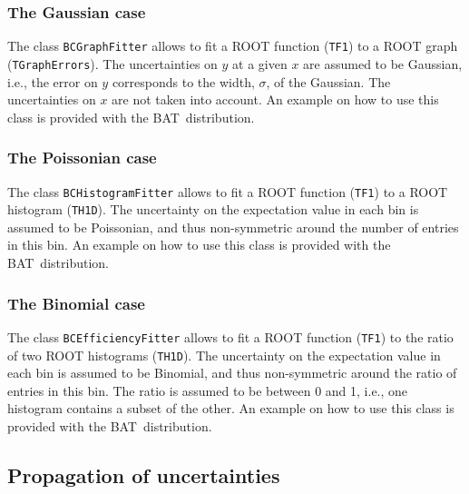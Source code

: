 \documentclass[11pt, a4paper]{article}
\newcommand{\BAT}{{\sc BAT}}
\begin{document}
\subsubsection{The Gaussian case}\label{BCGraphFitter} 

The class \verb|BCGraphFitter| allows to fit a ROOT function
(\verb|TF1|) to a ROOT graph (\verb|TGraphErrors|). The uncertainties
on $y$ at a given $x$ are assumed to be Gaussian, i.e., the error on
$y$ corresponds to the width, $\sigma$, of the Gaussian. The
uncertainties on $x$ are not taken into account. An example on how to
use this class is provided with the \BAT\ distribution.


\subsubsection{The Poissonian case} 

The class \verb|BCHistogramFitter| allows to fit a ROOT function
(\verb|TF1|) to a ROOT histogram (\verb|TH1D|). The uncertainty on the
expectation value in each bin is assumed to be Poissonian, and thus
non-symmetric around the number of entries in this bin. An example on
how to use this class is provided with the \BAT\ distribution.


\subsubsection{The Binomial case} 

The class \verb|BCEfficiencyFitter| allows to fit a ROOT function
(\verb|TF1|) to the ratio of two ROOT histograms (\verb|TH1D|). The
uncertainty on the expectation value in each bin is assumed to be
Binomial, and thus non-symmetric around the ratio of entries in this
bin. The ratio is assumed to be between 0 and 1, i.e., one histogram
contains a subset of the other. An example on how to use this class is
provided with the \BAT\ distribution.



\subsection{Propagation of uncertainties}
\end{document}
